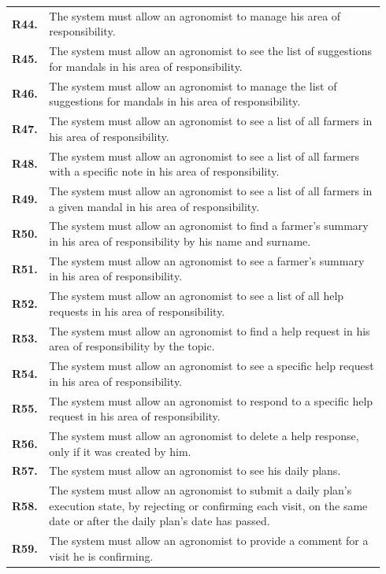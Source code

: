 \begin{longtable}{@{}p{0.06\linewidth} p{0.88\linewidth}}
	\textbf{R44.} & The system must allow an agronomist to manage his area of responsibility.\\
	\textbf{R45.} & The system must allow an agronomist to see the list of suggestions for mandals in his area of responsibility.\\
	\textbf{R46.} & The system must allow an agronomist to manage the list of suggestions for mandals in his area of responsibility.\\
	\textbf{R47.} & The system must allow an agronomist to see a list of all farmers in his area of responsibility.\\
	\textbf{R48.} & The system must allow an agronomist to see a list of all farmers with a specific note in his area of responsibility.\\
	\textbf{R49.} & The system must allow an agronomist to see a list of all farmers in a given mandal in his area of responsibility.\\
	\textbf{R50.} & The system must allow an agronomist to find a farmer's summary in his area of responsibility by his name and surname.\\
	\textbf{R51.} & The system must allow an agronomist to see a farmer's summary in his area of responsibility.\\
	\textbf{R52.} & The system must allow an agronomist to see a list of all help requests in his area of responsibility.\\
	\textbf{R53.} & The system must allow an agronomist to find a help request in his area of responsibility by the topic.\\
	\textbf{R54.} & The system must allow an agronomist to see a specific help request in his area of responsibility.\\
	\textbf{R55.} & The system must allow an agronomist to respond to a specific help request in his area of responsibility.\\
	\textbf{R56.} & The system must allow an agronomist to delete a help response, only if it was created by him.\\
	\textbf{R57.} & The system must allow an agronomist to see his daily plans.\\
	\textbf{R58.} & The system must allow an agronomist to submit a daily plan's execution state, by rejecting or confirming each visit, on the same date or after the daily plan's date has passed. \\
	\textbf{R59.} & The system must allow an agronomist to provide a comment for a visit he is confirming.\\

\end{longtable}
